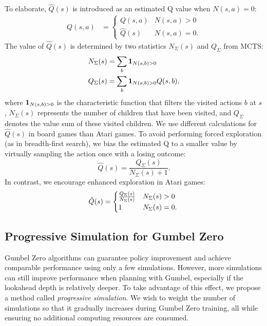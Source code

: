 To elaborate, $\hat{Q}(s)$ is introduced as an estimated Q value when $N(s,a)=0$:
\begin{equation}
\begin{aligned}
Q(s,a) &= 
\begin{cases}
Q(s,a) &  N(s,a) > 0 \\
\hat{Q}(s) &  N(s,a) = 0.
\end{cases}
\end{aligned}
\end{equation}
The value of $\hat{Q}(s)$ is determined by two statistics $N_{\Sigma}(s)$ and $Q_{\Sigma}$ from MCTS:
\begin{equation}
\begin{aligned}
N_{\Sigma}(s) &= \sum_{b} \bold{1}_{N(s,b)>0} \\
Q_{\Sigma}(s) &= \sum_{b} \bold{1}_{N(s,b)>0}Q(s,b),
\end{aligned}
\end{equation}
where $\bold{1}_{N(s,b)>0}$ is the characteristic function that filters the visited actions $b$ at $s$, $N_{\Sigma}(s)$ represents the number of children that have been visited, and $Q_{\Sigma}$ denotes the value sum of these visited children. 
We use different calculations for $\hat{Q}(s)$ in board games than Atari games. To avoid performing forced exploration (as in breadth-first search), we bias the estimated Q to a smaller value by virtually sampling the action once with a losing outcome:
\begin{equation}
\hat{Q}(s) = \frac{Q_{\Sigma}(s)}{N_{\Sigma}(s)+1}.
\end{equation}
In contrast, we encourage enhanced exploration in Atari games:
\begin{equation}
\hat{Q}(s) = 
\begin{cases}
\frac{Q_{\Sigma}(s)}{N_{\Sigma}(s)} & N_{\Sigma}(s)>0\\
1 & N_{\Sigma}(s)=0.
\end{cases} \\
\end{equation}

\subsection{Progressive Simulation for Gumbel Zero}\label{minizero:progressive_simulation}
Gumbel Zero algorithms can guarantee policy improvement and achieve comparable performance using only a few simulations.
However, more simulations can still improve performance when planning with Gumbel, especially if the lookahead depth is relatively deeper.
To take advantage of this effect, we propose a method called \textit{progressive simulation}.
We wish to weight the number of simulations so that it gradually increases during Gumbel Zero training, all while ensuring no additional computing resources are consumed.

